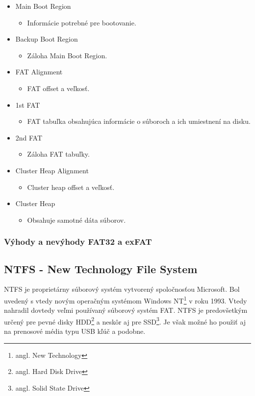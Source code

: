 \documentclass[12pt,oneside,slovak,a4paper]{article}
\begin{document}
\begin{itemize}
	\item Main Boot Region
		\begin{itemize}
			\item Informácie potrebné pre bootovanie.
		\end{itemize}
	\item Backup Boot Region
		\begin{itemize}
			\item Záloha Main Boot Region.
		\end{itemize}
	\item FAT Alignment
		\begin{itemize}
			\item FAT offset a veľkosť.
		\end{itemize}
	\item 1st FAT
		\begin{itemize}
			\item FAT tabuľka obsahujúca informácie o súboroch a ich umiestnení na disku.
		\end{itemize}
	\item 2nd FAT
		\begin{itemize}
			\item Záloha FAT tabuľky.
		\end{itemize}
	\item Cluster Heap Alignment
		\begin{itemize}
			\item Cluster heap offset a veľkosť.
		\end{itemize}
	\item Cluster Heap
		\begin{itemize}
			\item Obsahuje samotné dáta súborov.
		\end{itemize}
\end{itemize}

\subsubsection{Výhody a nevýhody FAT32 a exFAT}



\subsection{NTFS - New Technology File System}
NTFS je proprietárny súborový systém vytvorený spoločnosťou Microsoft. Bol uvedený s vtedy novým operačným systémom Windows NT\footnote{angl. New Technology} v roku 1993. Vtedy nahradil dovtedy veľmi používaný súborový systém FAT. NTFS je predovšetkým určený pre pevné disky HDD\footnote{angl. Hard Disk Drive} a neskôr aj pre SSD\footnote{angl. Solid State Drive}. Je však možné ho použiť aj na prenosové média typu USB kľúč a podobne. 
\end{document}
